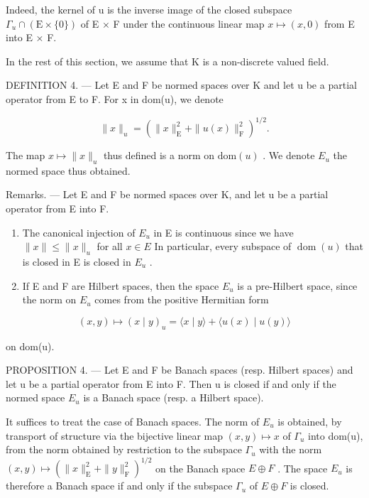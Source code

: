 Indeed, the kernel of u is the inverse image of the closed subspace \(\Gamma_{u} \cap (\mathrm{E} \times \{0\})\) of E × F under the continuous linear map \(x \mapsto (x, 0)\) from E into E × F.

In the rest of this section, we assume that K is a non-discrete valued field.

DEFINITION 4. --- Let E and F be normed spaces over K and let u be a partial operator from E to F. For x in dom(u), we denote

\[
\| x \| _ {u} = (\| x \| _ {\mathrm{E}} ^ {2} + \| u (x) \| _ {\mathrm{F}} ^ {2}) ^ {1 / 2}.
\]

The map \(x \mapsto \|x\|_{u}\) thus defined is a norm on \(\text{dom}(u)\) . We denote \(E_{u}\) the normed space thus obtained.

Remarks. --- Let E and F be normed spaces over K, and let u be a partial operator from E into F.

\begin{enumerate}
\def\labelenumi{\arabic{enumi})}
\item
  The canonical injection of \(E_{u}\) in E is continuous since we have \(\|x\|\leqslant\|x\|_{u}\) for all \(x\in E\) In particular, every subspace of \(\operatorname{dom}(u)\) that is closed in E is closed in \(E_{u}\) .
\item
  If E and F are Hilbert spaces, then the space \(E_{u}\) is a pre-Hilbert space, since the norm on \(E_{u}\) comes from the positive Hermitian form
\end{enumerate}

\[
(x, y) \mapsto (x \mid y) _ {u} = \langle x \mid y \rangle + \langle u (x) \mid u (y) \rangle
\]

on dom(u).

PROPOSITION 4. --- Let E and F be Banach spaces (resp. Hilbert spaces) and let u be a partial operator from E into F. Then u is closed if and only if the normed space \(E_{u}\) is a Banach space (resp. a Hilbert space).

It suffices to treat the case of Banach spaces. The norm of \(E_{u}\) is obtained, by transport of structure via the bijective linear map \((x,y)\mapsto x\) of \(\Gamma_{u}\) into dom(u), from the norm obtained by restriction to the subspace \(\Gamma_{u}\) with the norm \((x,y)\mapsto(\|x\|_{\mathrm{E}}^{2}+\|y\|_{\mathrm{F}}^{2})^{1/2}\) on the Banach space \(E\oplus F\) . The space \(E_{u}\) is therefore a Banach space if and only if the subspace \(\Gamma_{u}\) of \(E\oplus F\) is closed.

